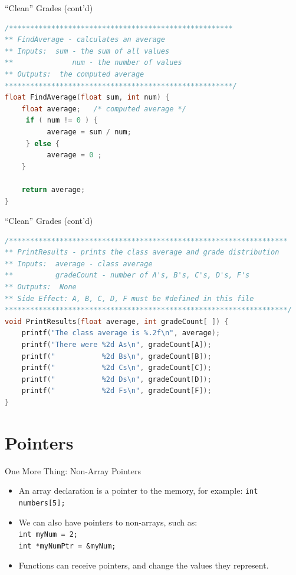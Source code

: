 \documentclass[graphics]{beamer}
\begin{document}
\begin{frame}[fragile]{``Clean'' Grades (cont'd)}
    \begin{lstlisting}[language=C,basicstyle=\scriptsize,keywordstyle=\color{blue},commentstyle=\color{green},showstringspaces=false,stringstyle=\color{red}]
/*****************************************************
** FindAverage - calculates an average
** Inputs:  sum - the sum of all values
**              num - the number of values
** Outputs:  the computed average
******************************************************/
float FindAverage(float sum, int num) {
    float average;   /* computed average */
     if ( num != 0 ) {
          average = sum / num;
     } else {
          average = 0 ;
    }

    return average;
}
    \end{lstlisting}
\end{frame}

\begin{frame}[fragile]{``Clean'' Grades (cont'd)}
    \begin{lstlisting}[language=C,basicstyle=\scriptsize,keywordstyle=\color{blue},commentstyle=\color{green},showstringspaces=false,stringstyle=\color{red}]
/******************************************************************
** PrintResults - prints the class average and grade distribution
** Inputs:  average - class average
**          gradeCount - number of A's, B's, C's, D's, F's
** Outputs:  None
** Side Effect: A, B, C, D, F must be #defined in this file
*******************************************************************/
void PrintResults(float average, int gradeCount[ ]) {
    printf("The class average is %.2f\n", average);
    printf("There were %2d As\n", gradeCount[A]);
    printf("           %2d Bs\n", gradeCount[B]);
    printf("           %2d Cs\n", gradeCount[C]);
    printf("           %2d Ds\n", gradeCount[D]);
    printf("           %2d Fs\n", gradeCount[F]);
}
    \end{lstlisting}
\end{frame}

\section*{Pointers}
\begin{frame}[fragile]{One More Thing: Non-Array Pointers}
    \begin{itemize}
        \item An array declaration is a pointer to the memory, for example: \texttt{int numbers[5];}
        \item We can also have pointers to non-arrays, such as: \\
        \texttt{int myNum = 2;}\\
        \texttt{int *myNumPtr = \&myNum;}
        \item Functions can receive pointers, and change the values they represent.
    \end{itemize}
\end{frame}
\end{document}
